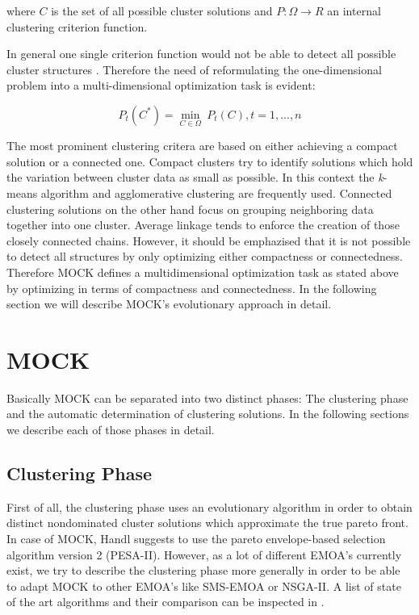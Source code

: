 \documentclass[parskip=half,DIV=14]{scrartcl}\usepackage[]{graphicx}\usepackage[]{color}
\begin{document}
where $C$ is the set of all possible cluster solutions and $P:\Omega \rightarrow R$ an internal clustering criterion function. 

In general one single criterion function would not be able to detect all possible cluster structures \cite{handl2007}. Therefore the need of reformulating the one-dimensional problem into a multi-dimensional optimization task is evident:

\begin{displaymath}
P_t(C^*) = \underset{C\in\Omega}{\min}\ P_t(C), t=1,...,n
\end{displaymath}

The most prominent clustering critera are based on either achieving a compact solution or a connected one. Compact clusters try to identify solutions which hold the variation between cluster data as small as possible. In this context the \textit{k}-means algorithm\cite{kmeans} and agglomerative clustering are frequently used. Connected clustering solutions on the other hand focus on grouping neighboring data together into one cluster. Average linkage tends to enforce the creation of those closely connected chains. However, it should be emphazised that it is not possible to detect all structures by only optimizing either compactness or connectedness. Therefore MOCK defines a multidimensional optimization task as stated above by optimizing in terms of compactness and connectedness. In the following section we will describe MOCK's evolutionary approach in detail.

\section{MOCK}

Basically MOCK can be separated into two distinct phases: The clustering phase and the automatic determination of clustering solutions. In the following sections we describe each of those phases in detail.

\subsection{Clustering Phase}
First of all, the clustering phase uses an evolutionary algorithm in order to obtain distinct nondominated cluster solutions which approximate the true pareto front. In case of MOCK, Handl suggests to use the pareto envelope-based selection algorithm version 2 (PESA-II). However, as a lot of different EMOA's currently exist, we try to describe the clustering phase more generally in order to be able to adapt MOCK to other EMOA's like SMS-EMOA or NSGA-II. A list of state of the art algorithms and their comparison can be inspected in \cite{comparison}.
\end{document}
